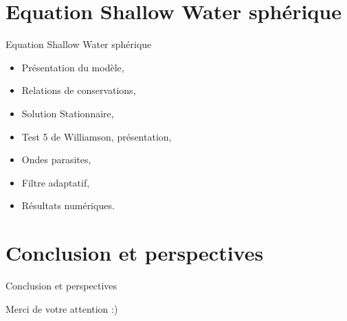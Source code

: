 \documentclass[11pt]{beamer}
\begin{document}
\section{Equation Shallow Water sphérique}
\begin{frame}{Equation Shallow Water sphérique}
\begin{itemize}
\item Présentation du modèle,
\item Relations de conservations,
\item Solution Stationnaire,
\item Test 5 de Williamson, présentation,
\item Ondes parasites,
\item Filtre adaptatif,
\item Résultats numériques.
\end{itemize}
\end{frame}


\section*{Conclusion et perspectives}
\begin{frame}{Conclusion et perspectives}

\end{frame}

\begin{frame}
\begin{center}
Merci de votre attention :)
\end{center}
\end{frame}
\end{document}
